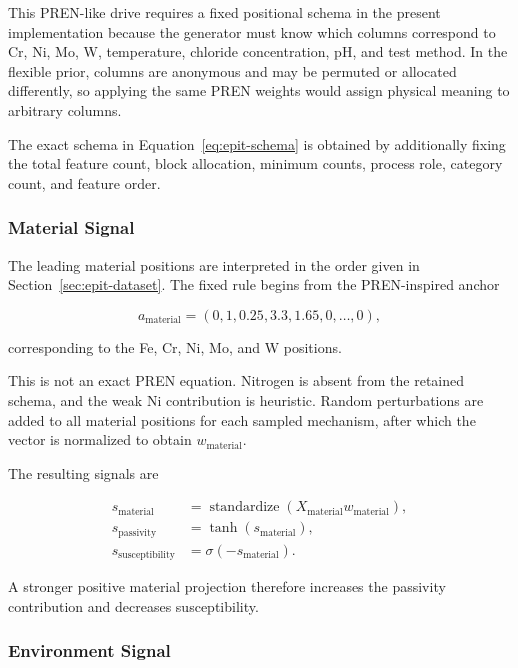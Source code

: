\documentclass{article}
\begin{document}
This PREN-like drive requires a fixed positional schema in the present
implementation because the generator must know which columns correspond to Cr,
Ni, Mo, W, temperature, chloride concentration, pH, and test method. In the
flexible prior, columns are anonymous and may be permuted or allocated
differently, so applying the same PREN weights would assign physical meaning to
arbitrary columns.

The exact schema in Equation~\eqref{eq:epit-schema} is obtained by additionally fixing the total feature count, block allocation, minimum counts, process role, category count, and feature order.

\subsubsection{Material Signal}

The leading material positions are interpreted in the order given in Section~\ref{sec:epit-dataset}. The fixed rule begins from the PREN-inspired anchor

\[
a_{\mathrm{material}}
=
(0,1,0.25,3.3,1.65,0,\ldots,0),
\]

corresponding to the Fe, Cr, Ni, Mo, and W positions.

This is not an exact PREN equation. Nitrogen is absent from the retained schema, and the weak Ni contribution is heuristic. Random perturbations are added to all material positions for each sampled mechanism, after which the vector is normalized to obtain \(w_{\mathrm{material}}\).

The resulting signals are

\begin{equation}
\begin{aligned}
s_{\mathrm{material}}
&=
\operatorname{standardize}
\left(
X_{\mathrm{material}}w_{\mathrm{material}}
\right),\\
s_{\mathrm{passivity}}
&=
\tanh(s_{\mathrm{material}}),\\
s_{\mathrm{susceptibility}}
&=
\sigma(-s_{\mathrm{material}}).
\end{aligned}
\label{eq:fixed-material-signals}
\end{equation}

A stronger positive material projection therefore increases the passivity contribution and decreases susceptibility.

\subsubsection{Environment Signal}
\end{document}
